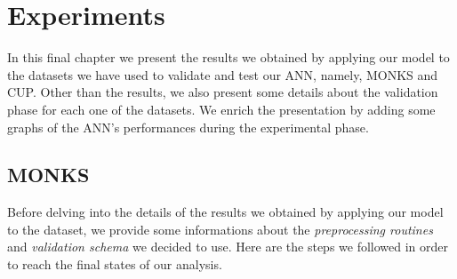 \chapter{Experiments} %
\label{cha:experiments}
    In this final chapter we present the results we obtained by applying our model to the datasets we have used
    to validate and test our ANN, namely, MONKS and CUP. Other than the results, we also present some details
    about the validation phase for each one of the datasets. We enrich the presentation by adding some graphs of
    the ANN's performances during the experimental phase.

    \section{MONKS} %
    \label{sec:monks}
        Before delving into the details of the results we obtained by applying our model to the dataset, we
        provide some informations about the \textit{preprocessing routines} and \textit{validation schema} we
        decided to use. Here are the steps we followed in order to reach the final states of our analysis.


